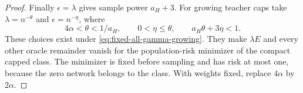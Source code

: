 \begin{proof}
Finally $\epsilon=\lambda$ gives sample power $a_H+3$.
For growing teacher caps take $\lambda=n^{-\theta}$ and
$\epsilon=n^{-\eta}$, where
\[
 4\alpha<\theta<1/a_H,\qquad
 0<\eta\leq\theta,\qquad a_H\theta+3\eta<1.
\]
These choices exist under \eqref{eq:fixed-all-gamma-growing}.
They make $\lambda E$ and every other oracle remainder vanish for the
population-risk minimizer of the compact capped class.  The minimizer
is fixed before sampling and has risk at most one, because the zero
network belongs to the class.  With weights fixed, replace $4\alpha$
by $2\alpha$.
\end{proof}
